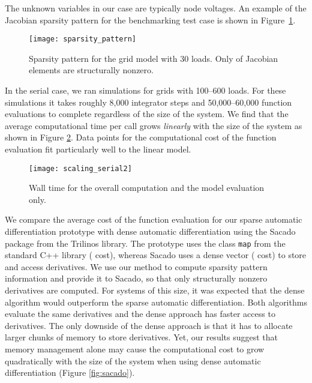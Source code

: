 \documentclass[10pt]{ijnam}
\theoremstyle{definition}
\begin{document}
The unknown variables  in our case are typically node voltages. An example of the Jacobian sparsity pattern for the benchmarking test case is shown in Figure~\ref{fig:sparsity_pattern}.

\begin{figure}[htb]
    \centering
    \texttt{[image: sparsity\_pattern]} 
    \caption{Sparsity pattern for the grid model with 30 loads. Only 
     of Jacobian elements are structurally nonzero. }
    \label{fig:sparsity_pattern}
\end{figure}

In the serial case, we ran simulations for grids with 100--600 loads. For these 
simulations it takes roughly 8,000 integrator steps and 50,000--60,000 function 
evaluations to complete regardless of the size of the system.
We find that the average computational time per call grows \textit{linearly} with 
the size of the system as shown in Figure \ref{fig:serial}. 
Data points for the computational cost of the function evaluation fit particularly 
well to the linear model. 



\begin{figure}[htb]
    \centering
    \texttt{[image: scaling\_serial2]} 
    \caption{Wall time for the overall computation and the model evaluation only.}
    \label{fig:serial}
\end{figure}

We compare the average cost of the function evaluation for our sparse automatic 
differentiation prototype with dense automatic differentiation using the
Sacado package from the Trilinos library. The prototype uses the class \verb|map| from the standard
C++ library ( cost), whereas Sacado uses a dense vector ( cost)
to store and access derivatives. We use our method to compute sparsity pattern 
information and provide it to Sacado, so that only structurally nonzero derivatives are computed. 
For systems of this size, it was expected that the dense algorithm would 
outperform the sparse automatic differentiation. Both algorithms evaluate 
the same derivatives and the dense approach has faster access to derivatives. 
The only downside of the dense approach is that it has to allocate larger 
chunks of memory to store derivatives. Yet, our results suggest that 
memory management alone may cause the computational cost to grow quadratically 
with the size of the system when using dense automatic differentiation 
(Figure \ref{fig:sacado}). 
\end{document}
